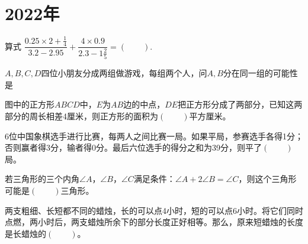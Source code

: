\section{2022年}
\label{sec:pengcheng-2022-grade-6}

\begin{question}
  算式 $\dfrac{0.25\times2+\frac14}{3.2-2.95} + \dfrac{4\times0.9}{2.3-1\frac25}=(\quad\quad).$
\end{question}

\begin{question}
  $A,B,C,D$四位小朋友分成两组做游戏，每组两个人，问$A,B$分在同一组的可能性是
\end{question}

\begin{question}
  图中的正方形$ABCD$中，$E$为$AB$边的中点，$DE$把正方形分成了两部分，已知这两部分的周长相差4厘米，则正方形的面积为$(\quad\quad)$平方厘米。

  \begin{center}
  \end{center}

\end{question}

\begin{question}
  6位中国象棋选手进行比赛，每两人之间比赛一局。如果平局，参赛选手各得1分；否则赢者得3分，输者得0分。最后六位选手的得分之和为39分，则平了$(\quad\quad)$局。
\end{question}

\begin{question}
  若三角形的三个内角$\angle A$，$\angle B$，$\angle C$满足条件：$\angle A+2\angle B=\angle C$，则这个三角形可能是$(\quad\quad)$三角形。
\end{question}

\begin{question}
  两支粗细、长短都不同的蜡烛，长的可以点4小时，短的可以点6小时。将它们同时点燃，两小时后，两支蜡烛所余下的部分长度正好相等。那么，原来短蜡烛的长度是长蜡烛的$(\quad\quad)$。
\end{question}


